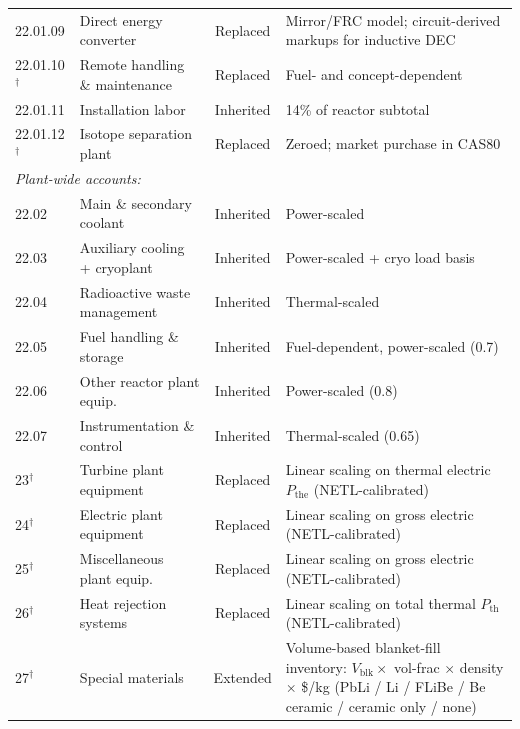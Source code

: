\documentclass{article}
\begin{document}
\begin{table}[htbp]
\begin{tabular}{llcp{6.0cm}}
\hspace{1em}22.01.09 & Direct energy converter & Replaced & Mirror/FRC model; circuit-derived markups for inductive DEC \\
\hspace{1em}22.01.10$^\dagger$ & Remote handling \& maintenance & Replaced & Fuel- and concept-dependent \\
\hspace{1em}22.01.11 & Installation labor & Inherited & 14\% of reactor subtotal \\
\hspace{1em}22.01.12$^\dagger$ & Isotope separation plant & Replaced & Zeroed; market purchase in CAS80 \\
\multicolumn{4}{l}{\textit{Plant-wide accounts:}} \\
\hspace{1em}22.02 & Main \& secondary coolant & Inherited & Power-scaled \\
\hspace{1em}22.03 & Auxiliary cooling + cryoplant & Inherited & Power-scaled + cryo load basis \\
\hspace{1em}22.04 & Radioactive waste management & Inherited & Thermal-scaled \\
\hspace{1em}22.05 & Fuel handling \& storage & Inherited & Fuel-dependent, power-scaled (0.7) \\
\hspace{1em}22.06 & Other reactor plant equip.\ & Inherited & Power-scaled (0.8) \\
\hspace{1em}22.07 & Instrumentation \& control & Inherited & Thermal-scaled (0.65) \\
23$^\dagger$ & Turbine plant equipment & Replaced & Linear scaling on thermal electric $P_{\text{the}}$ (NETL-calibrated) \\
24$^\dagger$ & Electric plant equipment & Replaced & Linear scaling on gross electric (NETL-calibrated) \\
25$^\dagger$ & Miscellaneous plant equip.\ & Replaced & Linear scaling on gross electric (NETL-calibrated) \\
26$^\dagger$ & Heat rejection systems & Replaced & Linear scaling on total thermal $P_{\text{th}}$ (NETL-calibrated) \\
27$^\dagger$ & Special materials & Extended & Volume-based blanket-fill inventory: $V_{\text{blk}} \times$ vol-frac $\times$ density $\times$ \$/kg (PbLi / Li / FLiBe / Be ceramic / ceramic only / none) \\

\end{tabular}
\end{table}
\end{document}
